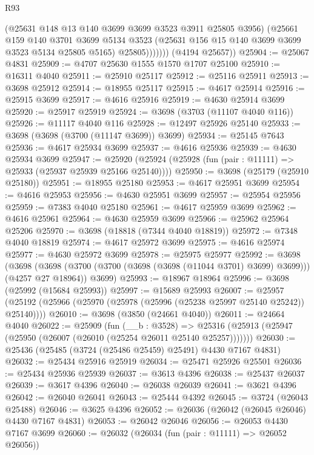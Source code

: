 \begin{lexlean}{R93}
\begin{coremodule}
                  (@25631 @148 @13 @140 @3699 @3699 @3523 @3911 @25805 @3956)
                  (@25661
                    @159
                    @140
                    @3701
                    @3699
                    @5134
                    @3523
                    (@25631 @156 @15 @140 @3699 @3699 @3523 @5134 @25805 @5165)
                    @25805)))))))
      (@4194 @25657))
@25904 := @25067 @4831
@25909 := @4707 @25630 @1555 @1570 @1707 @25100
@25910 := @16311 @4040
@25911 := @25910 @25117
@25912 := @25116 @25911
@25913 := @3698 @25912
@25914 := @18955 @25117
@25915 := @4617 @25914
@25916 := @25915 @3699
@25917 := @4616 @25916
@25919 := @4630 @25914 @3699
@25920 := @25917 @25919
@25924 := @3698 (@3703 (@11107 @4040 @116))
@25926 := @11117 @4040 @116
@25928 := @12497 @25926 @25140
@25933 := @3698 (@3698 (@3700 (@11147 @3699)) @3699)
@25934 := @25145 @7643
@25936 := @4617 @25934 @3699
@25937 := @4616 @25936
@25939 := @4630 @25934 @3699
@25947 := @25920 (@25924 (@25928 (fun (pair : @11111) => @25933 (@25937 @25939 @25166 @25140))))
@25950 := @3698 (@25179 (@25910 @25180))
@25951 := @18955 @25180
@25953 := @4617 @25951 @3699
@25954 := @4616 @25953
@25956 := @4630 @25951 @3699
@25957 := @25954 @25956
@25959 := @7383 @4040 @25180
@25961 := @4617 @25959 @3699
@25962 := @4616 @25961
@25964 := @4630 @25959 @3699
@25966 := @25962 @25964 @25206
@25970 := @3698 (@18818 (@7344 @4040 @18819))
@25972 := @7348 @4040 @18819
@25974 := @4617 @25972 @3699
@25975 := @4616 @25974
@25977 := @4630 @25972 @3699
@25978 := @25975 @25977
@25992 := @3698
    (@3698
      (@3698 (@3700 (@3700 (@3698 (@3698 (@11044 @3701) @3699) @3699))) (@4257 @27 @18964))
      @3699)
@25993 := @18967 @18964
@25996 := @3698 (@25992 (@15684 @25993))
@25997 := @15689 @25993
@26007 := @25957 (@25192 (@25966 (@25970 (@25978 (@25996 (@25238 @25997 @25140 @25242)) @25140))))
@26010 := @3698 (@3850 (@24661 @4040))
@26011 := @24664 @4040
@26022 := @25909
    (fun (__b : @3528) =>
    @25316 (@25913 (@25947 (@25950 (@26007 (@26010 (@25254 @26011 @25140 @25257)))))))
@26030 := @25436 (@25485 (@3724 (@25486 @25459) @25491) @4430 @7167 @4831)
@26032 := @25434 @25916 @25919
@26034 := @25471 @25926 @25501
@26036 := @25434 @25936 @25939
@26037 := @3613 @4396
@26038 := @25437 @26037
@26039 := @3617 @4396
@26040 := @26038 @26039
@26041 := @3621 @4396
@26042 := @26040 @26041
@26043 := @25444 @4392
@26045 := @3724 (@26043 @25488)
@26046 := @3625 @4396
@26052 := @26036 (@26042 (@26045 @26046) @4430 @7167 @4831)
@26053 := @26042 @26046
@26056 := @26053 @4430 @7167 @3699
@26060 := @26032 (@26034 (fun (pair : @11111) => @26052 @26056))

\end{coremodule}
\end{lexlean}
